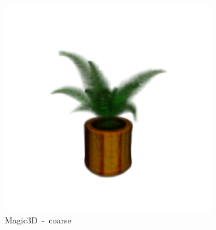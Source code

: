 \begin{figure}[ht]
    \centering
    \small
    \begin{subfigure}[b]{0.35\textwidth}
        \centering
        \includegraphics[width=\textwidth]{etc/a high-quality rendering of a fern in a wooden pot/magic3d/magic3D_fern_coarse_part1.png}
        \caption{Magic3D~-~coarse}
    \end{subfigure}
    \begin{subfigure}[b]{0.2\textwidth}
        \centering

\end{subfigure}
\end{figure}
